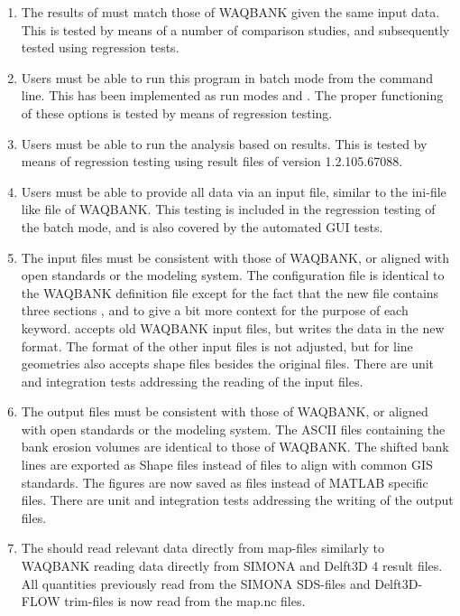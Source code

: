 \begin{enumerate}
\item The results of \dfastbe must match those of WAQBANK given the same input data.
This is tested by means of a number of comparison studies, and subsequently tested using regression tests.

\item Users must be able to run this program in batch mode from the command line.
This has been implemented as run modes  and .
The proper functioning of these options is tested by means of regression testing.

\item Users must be able to run the analysis based on \dflowfm results.
This is tested by means of regression testing using result files of \dflowfm version 1.2.105.67088.

\item Users must be able to provide all data via an input file, similar to the ini-file like file of WAQBANK.
This testing is included in the regression testing of the batch mode, and is also covered by the
automated GUI tests.

\item The input files must be consistent with those of WAQBANK, or aligned with open standards or the \dflowfm modeling system.
The \dfastbe configuration file is identical to the WAQBANK definition file except for the fact that the new file contains three sections \keyw{[General]}, \keyw{[Detect]} and \keyw{[Erosion]} to give a bit more context for the purpose of each keyword.
\dfastbe accepts old WAQBANK input files, but writes the data in the new format.
The format of the other input files is not adjusted, but for line geometries \dfastbe also accepts shape files besides the original  files.
There are unit and integration tests addressing the reading of the input files.

\item The output files must be consistent with those of WAQBANK, or aligned with open standards or the \dflowfm modeling system.
The ASCII files containing the bank erosion volumes are identical to those of WAQBANK.
The shifted bank lines are exported as Shape files instead of  files to align with common GIS standards.
The figures are now saved as  files instead of MATLAB specific  files.
There are unit and integration tests addressing the writing of the output files.

\item The should read relevant data directly from \dflowfm map-files similarly to WAQBANK reading data directly from SIMONA and Delft3D 4 result files.
All quantities previously read from the SIMONA SDS-files and Delft3D-FLOW trim-files is now read from the \dflowfm map.nc files.


\end{enumerate}

